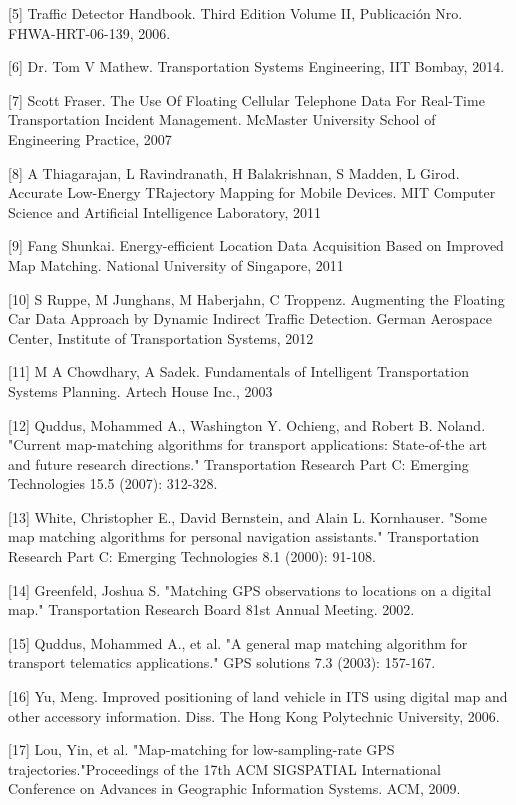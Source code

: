 \documentclass[final,fmstyle]{fpunathesis}
\begin{document}
[5] Traffic Detector Handbook. Third Edition Volume II, Publicación Nro. FHWA-HRT-06-139, 2006.

[6] Dr. Tom V Mathew. Transportation Systems Engineering, IIT Bombay, 2014.

[7] Scott Fraser. The Use Of Floating Cellular Telephone Data For Real-Time Transportation Incident Management. McMaster University School of Engineering Practice, 2007

[8] A Thiagarajan, L Ravindranath, H Balakrishnan, S Madden, L Girod. Accurate Low-Energy TRajectory Mapping for Mobile Devices. MIT Computer Science and Artificial Intelligence Laboratory, 2011

[9] Fang Shunkai. Energy-efficient Location Data Acquisition Based on Improved Map Matching. National University of Singapore, 2011

[10] S Ruppe, M Junghans, M Haberjahn, C Troppenz. Augmenting the Floating Car Data Approach by Dynamic Indirect Traffic Detection. German Aerospace Center, Institute of Transportation Systems, 2012

[11] M A Chowdhary, A Sadek. Fundamentals of Intelligent Transportation Systems Planning. Artech House Inc., 2003

[12] Quddus, Mohammed A., Washington Y. Ochieng, and Robert B. Noland. "Current map-matching algorithms for transport applications: State-of-the art and future research directions." Transportation Research Part C: Emerging Technologies 15.5 (2007): 312-328.

[13] White, Christopher E., David Bernstein, and Alain L. Kornhauser. "Some map matching algorithms for personal navigation assistants." Transportation Research Part C: Emerging Technologies 8.1 (2000): 91-108.

[14] Greenfeld, Joshua S. "Matching GPS observations to locations on a digital map." Transportation Research Board 81st Annual Meeting. 2002.

[15] Quddus, Mohammed A., et al. "A general map matching algorithm for transport telematics applications." GPS solutions 7.3 (2003): 157-167.

[16] Yu, Meng. Improved positioning of land vehicle in ITS using digital map and other accessory information. Diss. The Hong Kong Polytechnic University, 2006.

[17] Lou, Yin, et al. "Map-matching for low-sampling-rate GPS trajectories."Proceedings of the 17th ACM SIGSPATIAL International Conference on Advances in Geographic Information Systems. ACM, 2009.
\end{document}
